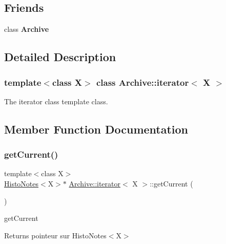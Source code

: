 \subsection*{Friends}
\begin{DoxyCompactItemize}
\item 
\mbox{\label{class_archive_1_1iterator_a4f1345bc28f2fd55b5ef2717d251ceea}} 
class {\bfseries Archive}
\end{DoxyCompactItemize}


\subsection{Detailed Description}
\subsubsection*{template$<$class X$>$\newline
class Archive\+::iterator$<$ X $>$}

The iterator class template class. 

\subsection{Member Function Documentation}
\mbox{\label{class_archive_1_1iterator_a8f49e9bd961cd99f47cb3a7e4f434282}} 
\subsubsection{\texorpdfstring{get\+Current()}{getCurrent()}}
{\footnotesize\ttfamily template$<$class X$>$ \\
\hyperlink{class_histo_notes}{Histo\+Notes}$<$X$>$$\ast$ \hyperlink{class_archive_1_1iterator}{Archive\+::iterator}$<$ X $>$\+::get\+Current (\begin{DoxyParamCaption}{ }\end{DoxyParamCaption})\hspace{0.3cm}{\ttfamily [inline]}}



get\+Current 

\begin{DoxyReturn}{Returns}
pointeur sur Histo\+Notes$<$\+X$>$ 
\end{DoxyReturn}
\mbox{\label{class_archive_1_1iterator_a17c9f59d82e1001c1d7529e955b11dac}} 
